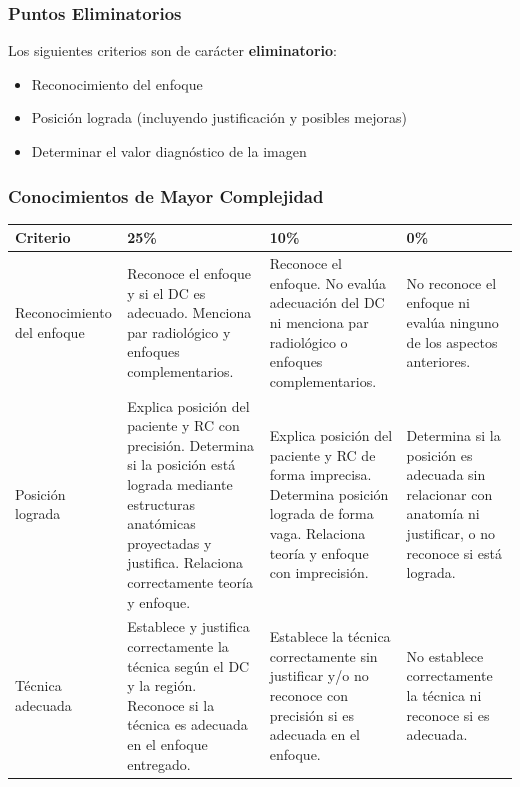 	\subsubsection*{Puntos Eliminatorios}
	
	Los siguientes criterios son de carácter \textbf{eliminatorio}:
	
	\begin{itemize}
		\item Reconocimiento del enfoque
		\item Posición lograda (incluyendo justificación y posibles mejoras)
		\item Determinar el valor diagnóstico de la imagen
	\end{itemize}
	
	\subsubsection*{Conocimientos de Mayor Complejidad}
	
	\begin{table}[h]
		\centering
		\renewcommand{\arraystretch}{1.5}
		\begin{tabular}{|p{3cm}|p{4.5cm}|p{4.5cm}|p{3.5cm}|}
			\hline
			\textbf{Criterio} & \textbf{25\%} & \textbf{10\%} & \textbf{0\%} \\
			\hline
			Reconocimiento del enfoque &
			Reconoce el enfoque y si el DC es adecuado. Menciona par radiológico y enfoques complementarios. &
			Reconoce el enfoque. No evalúa adecuación del DC ni menciona par radiológico o enfoques complementarios. &
			No reconoce el enfoque ni evalúa ninguno de los aspectos anteriores. \\
			\hline
			Posición lograda &
			Explica posición del paciente y RC con precisión. Determina si la posición está lograda mediante estructuras anatómicas proyectadas y justifica. Relaciona correctamente teoría y enfoque. &
			Explica posición del paciente y RC de forma imprecisa. Determina posición lograda de forma vaga. Relaciona teoría y enfoque con imprecisión. &
			Determina si la posición es adecuada sin relacionar con anatomía ni justificar, o no reconoce si está lograda. \\
			\hline
			Técnica adecuada &
			Establece y justifica correctamente la técnica según el DC y la región. Reconoce si la técnica es adecuada en el enfoque entregado. &
			Establece la técnica correctamente sin justificar y/o no reconoce con precisión si es adecuada en el enfoque. &
			No establece correctamente la técnica ni reconoce si es adecuada. \\
			\hline
		\end{tabular}
	\end{table}
	
